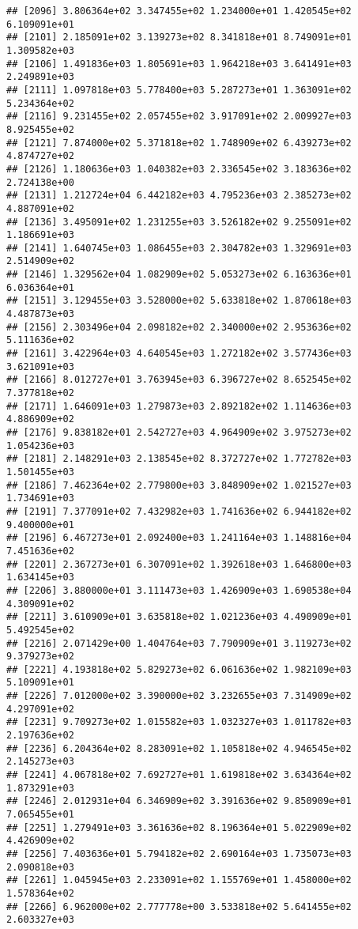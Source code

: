 \documentclass[]{article}
\begin{document}
\begin{verbatim}
## [2096] 3.806364e+02 3.347455e+02 1.234000e+01 1.420545e+02 6.109091e+01
## [2101] 2.185091e+02 3.139273e+02 8.341818e+01 8.749091e+01 1.309582e+03
## [2106] 1.491836e+03 1.805691e+03 1.964218e+03 3.641491e+03 2.249891e+03
## [2111] 1.097818e+03 5.778400e+03 5.287273e+01 1.363091e+02 5.234364e+02
## [2116] 9.231455e+02 2.057455e+02 3.917091e+02 2.009927e+03 8.925455e+02
## [2121] 7.874000e+02 5.371818e+02 1.748909e+02 6.439273e+02 4.874727e+02
## [2126] 1.180636e+03 1.040382e+03 2.336545e+02 3.183636e+02 2.724138e+00
## [2131] 1.212724e+04 6.442182e+03 4.795236e+03 2.385273e+02 4.887091e+02
## [2136] 3.495091e+02 1.231255e+03 3.526182e+02 9.255091e+02 1.186691e+03
## [2141] 1.640745e+03 1.086455e+03 2.304782e+03 1.329691e+03 2.514909e+02
## [2146] 1.329562e+04 1.082909e+02 5.053273e+02 6.163636e+01 6.036364e+01
## [2151] 3.129455e+03 3.528000e+02 5.633818e+02 1.870618e+03 4.487873e+03
## [2156] 2.303496e+04 2.098182e+02 2.340000e+02 2.953636e+02 5.111636e+02
## [2161] 3.422964e+03 4.640545e+03 1.272182e+02 3.577436e+03 3.621091e+03
## [2166] 8.012727e+01 3.763945e+03 6.396727e+02 8.652545e+02 7.377818e+02
## [2171] 1.646091e+03 1.279873e+03 2.892182e+02 1.114636e+03 4.886909e+02
## [2176] 9.838182e+01 2.542727e+03 4.964909e+02 3.975273e+02 1.054236e+03
## [2181] 2.148291e+03 2.138545e+02 8.372727e+02 1.772782e+03 1.501455e+03
## [2186] 7.462364e+02 2.779800e+03 3.848909e+02 1.021527e+03 1.734691e+03
## [2191] 7.377091e+02 7.432982e+03 1.741636e+02 6.944182e+02 9.400000e+01
## [2196] 6.467273e+01 2.092400e+03 1.241164e+03 1.148816e+04 7.451636e+02
## [2201] 2.367273e+01 6.307091e+02 1.392618e+03 1.646800e+03 1.634145e+03
## [2206] 3.880000e+01 3.111473e+03 1.426909e+03 1.690538e+04 4.309091e+02
## [2211] 3.610909e+01 3.635818e+02 1.021236e+03 4.490909e+01 5.492545e+02
## [2216] 2.071429e+00 1.404764e+03 7.790909e+01 3.119273e+02 9.379273e+02
## [2221] 4.193818e+02 5.829273e+02 6.061636e+02 1.982109e+03 5.109091e+01
## [2226] 7.012000e+02 3.390000e+02 3.232655e+03 7.314909e+02 4.297091e+02
## [2231] 9.709273e+02 1.015582e+03 1.032327e+03 1.011782e+03 2.197636e+02
## [2236] 6.204364e+02 8.283091e+02 1.105818e+02 4.946545e+02 2.145273e+03
## [2241] 4.067818e+02 7.692727e+01 1.619818e+02 3.634364e+02 1.873291e+03
## [2246] 2.012931e+04 6.346909e+02 3.391636e+02 9.850909e+01 7.065455e+01
## [2251] 1.279491e+03 3.361636e+02 8.196364e+01 5.022909e+02 4.426909e+02
## [2256] 7.403636e+01 5.794182e+02 2.690164e+03 1.735073e+03 2.090818e+03
## [2261] 1.045945e+03 2.233091e+02 1.155769e+01 1.458000e+02 1.578364e+02
## [2266] 6.962000e+02 2.777778e+00 3.533818e+02 5.641455e+02 2.603327e+03

\end{verbatim}
\end{document}
